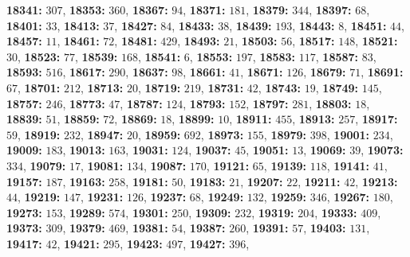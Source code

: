 \textsf{\bfseries 18341:} $307$, \textsf{\bfseries 18353:} $360$, \textsf{\bfseries 18367:} $94$, \textsf{\bfseries 18371:} $181$, \textsf{\bfseries 18379:} $344$, \textsf{\bfseries 18397:} $68$, \textsf{\bfseries 18401:} $33$, \textsf{\bfseries 18413:} $37$, \textsf{\bfseries 18427:} $84$, \textsf{\bfseries 18433:} $38$, \textsf{\bfseries 18439:} $193$, \textsf{\bfseries 18443:} $8$, \textsf{\bfseries 18451:} $44$, \textsf{\bfseries 18457:} $11$, \textsf{\bfseries 18461:} $72$, \textsf{\bfseries 18481:} $429$, \textsf{\bfseries 18493:} $21$, \textsf{\bfseries 18503:} $56$, \textsf{\bfseries 18517:} $148$, \textsf{\bfseries 18521:} $30$, \textsf{\bfseries 18523:} $77$, \textsf{\bfseries 18539:} $168$, \textsf{\bfseries 18541:} $6$, \textsf{\bfseries 18553:} $197$, \textsf{\bfseries 18583:} $117$, \textsf{\bfseries 18587:} $83$, \textsf{\bfseries 18593:} $516$, \textsf{\bfseries 18617:} $290$, \textsf{\bfseries 18637:} $98$, \textsf{\bfseries 18661:} $41$, \textsf{\bfseries 18671:} $126$, \textsf{\bfseries 18679:} $71$, \textsf{\bfseries 18691:} $67$, \textsf{\bfseries 18701:} $212$, \textsf{\bfseries 18713:} $20$, \textsf{\bfseries 18719:} $219$, \textsf{\bfseries 18731:} $42$, \textsf{\bfseries 18743:} $19$, \textsf{\bfseries 18749:} $145$, \textsf{\bfseries 18757:} $246$, \textsf{\bfseries 18773:} $47$, \textsf{\bfseries 18787:} $124$, \textsf{\bfseries 18793:} $152$, \textsf{\bfseries 18797:} $281$, \textsf{\bfseries 18803:} $18$, \textsf{\bfseries 18839:} $51$, \textsf{\bfseries 18859:} $72$, \textsf{\bfseries 18869:} $18$, \textsf{\bfseries 18899:} $10$, \textsf{\bfseries 18911:} $455$, \textsf{\bfseries 18913:} $257$, \textsf{\bfseries 18917:} $59$, \textsf{\bfseries 18919:} $232$, \textsf{\bfseries 18947:} $20$, \textsf{\bfseries 18959:} $692$, \textsf{\bfseries 18973:} $155$, \textsf{\bfseries 18979:} $398$, \textsf{\bfseries 19001:} $234$, \textsf{\bfseries 19009:} $183$, \textsf{\bfseries 19013:} $163$, \textsf{\bfseries 19031:} $124$, \textsf{\bfseries 19037:} $45$, \textsf{\bfseries 19051:} $13$, \textsf{\bfseries 19069:} $39$, \textsf{\bfseries 19073:} $334$, \textsf{\bfseries 19079:} $17$, \textsf{\bfseries 19081:} $134$, \textsf{\bfseries 19087:} $170$, \textsf{\bfseries 19121:} $65$, \textsf{\bfseries 19139:} $118$, \textsf{\bfseries 19141:} $41$, \textsf{\bfseries 19157:} $187$, \textsf{\bfseries 19163:} $258$, \textsf{\bfseries 19181:} $50$, \textsf{\bfseries 19183:} $21$, \textsf{\bfseries 19207:} $22$, \textsf{\bfseries 19211:} $42$, \textsf{\bfseries 19213:} $44$, \textsf{\bfseries 19219:} $147$, \textsf{\bfseries 19231:} $126$, \textsf{\bfseries 19237:} $68$, \textsf{\bfseries 19249:} $132$, \textsf{\bfseries 19259:} $346$, \textsf{\bfseries 19267:} $180$, \textsf{\bfseries 19273:} $153$, \textsf{\bfseries 19289:} $574$, \textsf{\bfseries 19301:} $250$, \textsf{\bfseries 19309:} $232$, \textsf{\bfseries 19319:} $204$, \textsf{\bfseries 19333:} $409$, \textsf{\bfseries 19373:} $309$, \textsf{\bfseries 19379:} $469$, \textsf{\bfseries 19381:} $54$, \textsf{\bfseries 19387:} $260$, \textsf{\bfseries 19391:} $57$, \textsf{\bfseries 19403:} $131$, \textsf{\bfseries 19417:} $42$, \textsf{\bfseries 19421:} $295$, \textsf{\bfseries 19423:} $497$, \textsf{\bfseries 19427:} $396$, 
